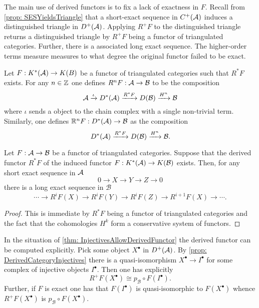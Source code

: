 The main use of derived functors is to fix a lack of exactness in $F$.
Recall from \cref{prop: SESYieldsTriangle} that a short-exact sequence in $C^+(\AA)$ induces a distinguished triangle in $D^+(\AA)$.
Applying $R^+F$ to the distinguished triangle returns a distinguished triangle by $R^+F$ being a functor of triangulated categories.
Further, there is a associated long exact sequence.
The higher-order terms measure measures to what degree the original functor failed to be exact.
\begin{definition}
 Let $F:K^*(\AA) \to K(B)$ be a functor of triangulated categories such that $R^*F$ exists.
 For any $n\in \Z$ one defines $R^nF:\AA \to \mathcal{B}$ to be the composition
 $$\AA\xrightarrow{\iota} D^*(\AA) \xrightarrow{R^*F} D(\mathcal{B}) \xrightarrow{H^n} \mathcal{B} $$
 where $\iota$ sends a object to the chain complex with a single non-trivial term.
 Similarly, one defines $\mathbb{R}^nF:D^*(\AA)\to \mathcal{B}$ as the composition
 $$D^*(\AA) \xrightarrow{R^*F} D(\mathcal{B}) \xrightarrow{H^n} \mathcal{B}. $$
\end{definition}
\begin{proposition}
   Let $F:\AA\to \mathcal{B}$ be a functor of triangulated categories.
   Suppose that the derived functor $R^*F$ of the induced functor $F:K^*(\AA)\to K(\mathcal{B})$ exists.
   Then, for any short exact sequence in $\AA$
   $$0\to X \to Y \to Z \to 0 $$
   there is a long exact sequence in $\mathcal{B}$
   $$ \cdots \to R^{i}F(X)\to R^{i}F(Y) \to R^iF(Z) \to R^{i+1}F(X)\to \cdots. $$
\end{proposition}
\begin{proof}
  This is immediate by $R^*F$ being a functor of triangulated categories and the fact that the cohomologies $H^k$ form a conservative system of functors.
\end{proof}
In the situation of \cref{thm: InjectivesAllowDerivedFunctor} the derived functor can be computed explicitly.
Pick some object $X^\bullet$ in $D^+(\AA)$.
By \cref{prop: DerivedCategoryInjectives} there is a quasi-isomorphism $X^\bullet\to I^\bullet$ for some complex of injective objects $I^\bullet$.
Then one has explicitly
$$R^+F(X^\bullet) \cong p_\mathcal{B} \circ F(I^\bullet). $$
Further, if $F$ is exact one has that $F(I^\bullet)$ is quasi-isomorphic to $F(X^\bullet)$ whence $R^+F(X^\bullet)$ is $p_\mathcal{B}\circ F(X^\bullet)$.

